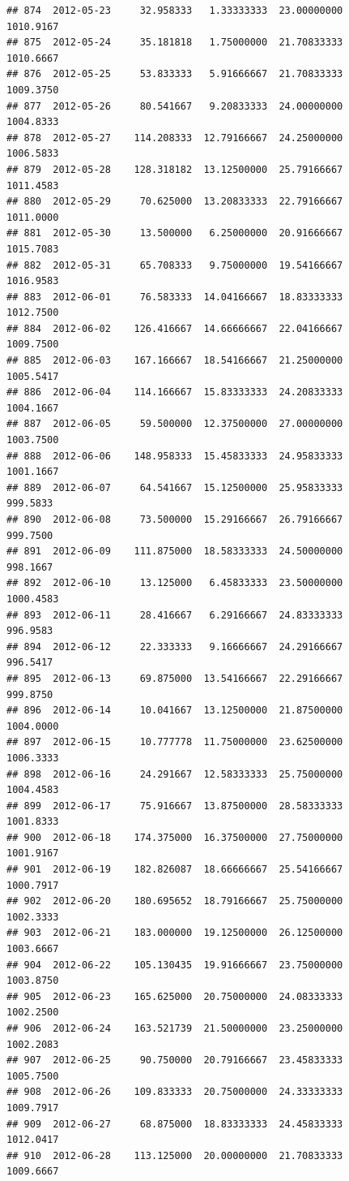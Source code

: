 \documentclass[
]{article}
\begin{document}
\begin{verbatim}
## 874  2012-05-23     32.958333   1.33333333  23.00000000    1010.9167
## 875  2012-05-24     35.181818   1.75000000  21.70833333    1010.6667
## 876  2012-05-25     53.833333   5.91666667  21.70833333    1009.3750
## 877  2012-05-26     80.541667   9.20833333  24.00000000    1004.8333
## 878  2012-05-27    114.208333  12.79166667  24.25000000    1006.5833
## 879  2012-05-28    128.318182  13.12500000  25.79166667    1011.4583
## 880  2012-05-29     70.625000  13.20833333  22.79166667    1011.0000
## 881  2012-05-30     13.500000   6.25000000  20.91666667    1015.7083
## 882  2012-05-31     65.708333   9.75000000  19.54166667    1016.9583
## 883  2012-06-01     76.583333  14.04166667  18.83333333    1012.7500
## 884  2012-06-02    126.416667  14.66666667  22.04166667    1009.7500
## 885  2012-06-03    167.166667  18.54166667  21.25000000    1005.5417
## 886  2012-06-04    114.166667  15.83333333  24.20833333    1004.1667
## 887  2012-06-05     59.500000  12.37500000  27.00000000    1003.7500
## 888  2012-06-06    148.958333  15.45833333  24.95833333    1001.1667
## 889  2012-06-07     64.541667  15.12500000  25.95833333     999.5833
## 890  2012-06-08     73.500000  15.29166667  26.79166667     999.7500
## 891  2012-06-09    111.875000  18.58333333  24.50000000     998.1667
## 892  2012-06-10     13.125000   6.45833333  23.50000000    1000.4583
## 893  2012-06-11     28.416667   6.29166667  24.83333333     996.9583
## 894  2012-06-12     22.333333   9.16666667  24.29166667     996.5417
## 895  2012-06-13     69.875000  13.54166667  22.29166667     999.8750
## 896  2012-06-14     10.041667  13.12500000  21.87500000    1004.0000
## 897  2012-06-15     10.777778  11.75000000  23.62500000    1006.3333
## 898  2012-06-16     24.291667  12.58333333  25.75000000    1004.4583
## 899  2012-06-17     75.916667  13.87500000  28.58333333    1001.8333
## 900  2012-06-18    174.375000  16.37500000  27.75000000    1001.9167
## 901  2012-06-19    182.826087  18.66666667  25.54166667    1000.7917
## 902  2012-06-20    180.695652  18.79166667  25.75000000    1002.3333
## 903  2012-06-21    183.000000  19.12500000  26.12500000    1003.6667
## 904  2012-06-22    105.130435  19.91666667  23.75000000    1003.8750
## 905  2012-06-23    165.625000  20.75000000  24.08333333    1002.2500
## 906  2012-06-24    163.521739  21.50000000  23.25000000    1002.2083
## 907  2012-06-25     90.750000  20.79166667  23.45833333    1005.7500
## 908  2012-06-26    109.833333  20.75000000  24.33333333    1009.7917
## 909  2012-06-27     68.875000  18.83333333  24.45833333    1012.0417
## 910  2012-06-28    113.125000  20.00000000  21.70833333    1009.6667

\end{verbatim}
\end{document}
